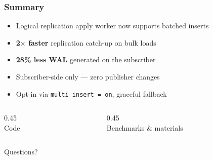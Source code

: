 \documentclass{beamer}
\begin{document}

\begin{frame}\frametitle{Summary}
\begin{itemize}
  \item Logical replication apply worker now supports batched inserts
  \item \textbf{2$\times$ faster} replication catch-up on bulk loads
  \item \textbf{28\% less WAL} generated on the subscriber
  \item Subscriber-side only --- zero publisher changes
  \item Opt-in via \texttt{multi\_insert = on}, graceful fallback
\end{itemize}
\bigskip
\begin{center}
\begin{columns}[c]
\begin{column}{0.45\textwidth}
\centering
{}
\vspace{2mm}\\
{\tiny Code}
\end{column}
\begin{column}{0.45\textwidth}
\centering
{}
\vspace{2mm}\\
{\tiny Benchmarks \& materials}
\end{column}
\end{columns}
\end{center}
\end{frame}
\begin{frame}
\vspace*{\fill}
\begin{center}
\huge{Questions?}
\bigskip

\end{center}
\vspace*{\fill}
\end{frame}
\end{document}
